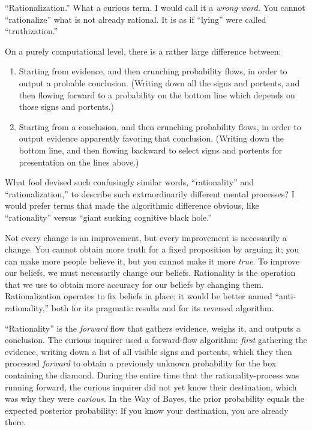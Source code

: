 {
 ``Rationalization.'' What a
curious term. I would call it a \textit{wrong word.} You cannot
``rationalize'' what is not already
rational. It is as if ``lying'' were
called ``truthization.''}

{
 On a purely computational level, there is a rather large
difference between:}

\begin{enumerate}
\item {
 Starting from evidence, and then crunching probability flows, in
order to output a probable conclusion. (Writing down all the signs and
portents, and then flowing forward to a probability on the bottom line
which depends on those signs and portents.)}

\item {
 Starting from a conclusion, and then crunching probability flows,
in order to output evidence apparently favoring that conclusion.
(Writing down the bottom line, and then flowing backward to select
signs and portents for presentation on the lines above.)}
\end{enumerate}

{
 What fool devised such confusingly similar words,
``rationality'' and
``rationalization,'' to describe
such extraordinarily different mental processes? I would prefer terms
that made the algorithmic difference obvious, like
``rationality'' versus
``giant sucking cognitive black
hole.''}

{
 Not every change is an improvement, but every improvement is
necessarily a change. You cannot obtain more truth for a fixed
proposition by arguing it; you can make more people believe it, but you
cannot make it more \textit{true}. To improve our beliefs, we must
necessarily change our beliefs. Rationality is the operation that we
use to obtain more accuracy for our beliefs by changing them.
Rationalization operates to fix beliefs in place; it would be better
named ``anti-rationality,'' both for
its pragmatic results and for its reversed algorithm.}

{
 ``Rationality'' is the
\textit{forward} flow that gathers evidence, weighs it, and outputs a
conclusion. The curious inquirer used a forward-flow algorithm:
\textit{first} gathering the evidence, writing down a list of all
visible signs and portents, which they then processed \textit{forward}
to obtain a previously unknown probability for the box containing the
diamond. During the entire time that the rationality-process was
running forward, the curious inquirer did not yet know their
destination, which was why they were \textit{curious.} In the Way of
Bayes, the prior probability equals the expected posterior probability:
If you know your destination, you are already there.}

